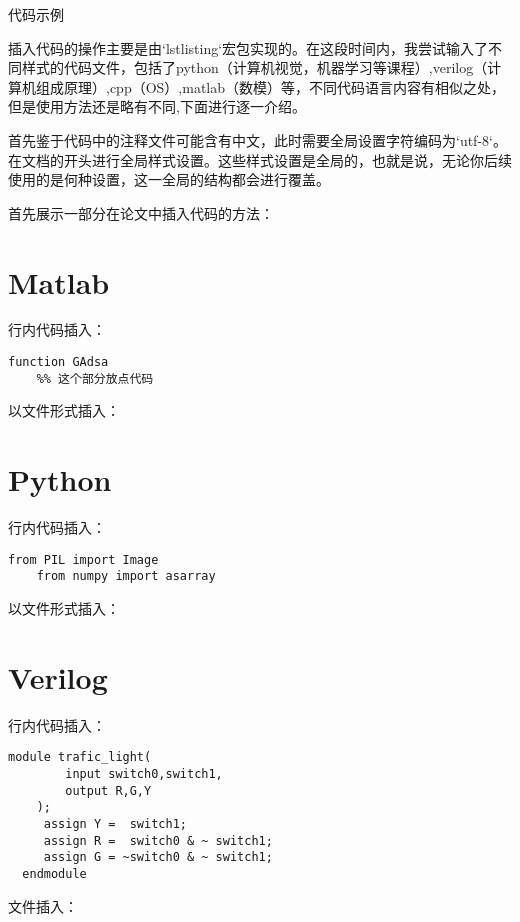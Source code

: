 \documentclass{ctexart}
\begin{document}
\begin{center}
    {\fontsize{15.75pt}{0}\heiti 代码示例}
\end{center}

插入代码的操作主要是由`lstlisting`宏包实现的。在这段时间内，我尝试输入了不同样式的代码文件，包括了python（计算机视觉，机器学习等课程）,verilog（计算机组成原理）,cpp（OS）,matlab（数模）等，不同代码语言内容有相似之处，但是使用方法还是略有不同,下面进行逐一介绍。

首先鉴于代码中的注释文件可能含有中文，此时需要全局设置字符编码为`utf-8`。在文档的开头进行全局样式设置。这些样式设置是全局的，也就是说，无论你后续使用的是何种设置，这一全局的结构都会进行覆盖。

首先展示一部分在论文中插入代码的方法：
\section{Matlab}
行内代码插入：

\begin{lstlisting}[style=Matlab-editor]
    function GAdsa 
    %% 这个部分放点代码
\end{lstlisting}

以文件形式插入：


\section{Python}
行内代码插入：

\begin{lstlisting}[style=python_style]
    from PIL import Image
    from numpy import asarray
\end{lstlisting}

以文件形式插入：



\section{Verilog}

行内代码插入：

\begin{lstlisting}[style={prettyverilog}]
    module trafic_light(
		input switch0,switch1,
		output R,G,Y
    );
	 assign Y =  switch1;
	 assign R =  switch0 & ~ switch1;
	 assign G = ~switch0 & ~ switch1;
  endmodule
\end{lstlisting}

文件插入：


\end{document}
